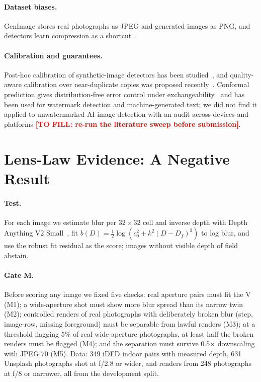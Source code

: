 \documentclass[10pt,twocolumn]{article}
\newcommand{\tofill}[1]{\textcolor{red}{\textbf{[TO FILL: #1]}}}
\begin{document}
\paragraph{Dataset biases.}
GenImage stores real photographs as JPEG and generated images as PNG, and
detectors learn compression as a shortcut~\cite{grommelt2024fake}.

\paragraph{Calibration and guarantees.}
Post-hoc calibration of synthetic-image detectors has been
studied~\cite{guo2017calibration}, and quality-aware calibration over
near-duplicate copies was proposed recently~\cite{guillaro2026quad}.
Conformal prediction gives distribution-free error control under
exchangeability~\cite{vovk2005algorithmic,angelopoulos2023gentle} and has been
used for watermark detection and machine-generated text; we did not find it
applied to unwatermarked AI-image detection with an audit across devices and
platforms \tofill{re-run the literature sweep before submission}.

\section{Lens-Law Evidence: A Negative Result}
\label{sec:lens}
\paragraph{Test.} For each image we estimate blur per $32{\times}32$ cell and
inverse depth with Depth Anything V2 Small~\cite{yang2024depthv2}, fit
$b(D) = \tfrac12\log(c_0^2 + k^2(D-D_f)^2)$ to log blur, and use the robust
fit residual as the score; images without visible depth of field abstain.

\paragraph{Gate M.} Before scoring any image we fixed five checks: real
aperture pairs must fit the V (M1); a wide-aperture shot must show more blur
spread than its narrow twin (M2); controlled renders of real photographs with
deliberately broken blur (step, image-row, missing foreground) must be
separable from lawful renders (M3); at a threshold flagging 5\% of real
wide-aperture photographs, at least half the broken renders must be flagged
(M4); and the separation must survive 0.5$\times$ downscaling with JPEG 70
(M5). Data: 349 iDFD indoor pairs with measured depth, 631 Unsplash
photographs shot at f/2.8 or wider, and renders from 248 photographs at f/8 or
narrower, all from the development split.
\end{document}
